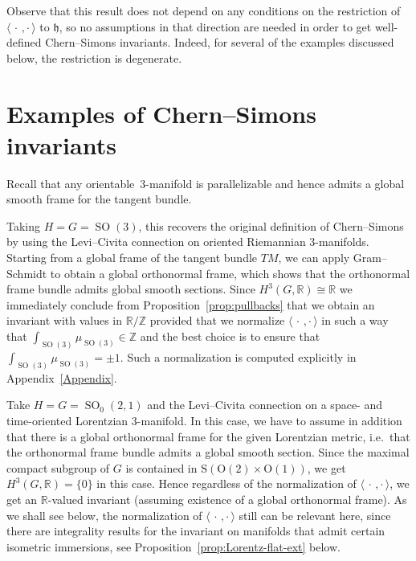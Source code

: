 \documentclass[AHL,Unicode,longabstracts]{cedram}
\newcommand{\x}{\times}
\newcommand{\B}[2]{\langle#1,#2\rangle}
\DeclareMathOperator{\SO}{SO}
\newcommand{\rmO}{\mathrm{O}}
\newcommand{\rmS}{\mathrm{S}}
\newcommand*{\R}{\mathbb{R}}
\newcommand{\Z}{\mathbb{Z}}
\newcommand{\fkh}{\mathfrak{h}}
\newcommand*{\R}{\mathbb{R}}
\begin{document}
\begin{rema}
Observe that this result does not depend on any conditions on the restriction of $\B{\,\cdot\,}{\cdot\,}$ to $\fkh$, so no assumptions in that direction are needed in order to get well-defined Chern--Simons invariants. Indeed, for several of the examples discussed below, the restriction is degenerate.
\end{rema}

\section{Examples of Chern--Simons invariants}\label{1.4}
Recall that any orientable~$3$-manifold is parallelizable and hence admits a global smooth frame for the tangent bundle.

\begin{exam}\label{exam4.1}
Taking $H=G=\SO(3)$, this recovers the original definition of Chern--Simons by using the Levi--Civita connection on oriented Riemannian $3$-manifolds. Starting from a global frame of the tangent bundle $TM$, we can apply Gram--Schmidt to obtain a global orthonormal frame, which shows that the orthonormal frame bundle admits global smooth sections. Since $H^3(G,\R)\cong\R$ we immediately conclude from Proposition~\ref{prop:pullbacks} that we obtain an invariant with values in $\R/\Z$ provided that we normalize $\B{\,\cdot\,}{\cdot\,}$ in such a way that $\int_{\SO(3)}\mu_{\SO(3)}\in\Z$ and the best choice is to ensure that $\int_{\SO(3)}\mu_{\SO(3)}=\pm 1$. Such a normalization is computed explicitly in Appendix~\ref{Appendix}.
\end{exam}


\begin{exam}\label{exam4.2}
Take $H=G=\SO_0(2,1)$ and the Levi--Civita connection on a space- and time-oriented Lorentzian $3$-manifold. In this case, we have to assume in addition that there is a global orthonormal frame for the given Lorentzian metric, i.e.\ that the orthonormal frame bundle admits a global smooth section. Since the maximal compact subgroup of $G$ is contained in $\rmS(\rmO(2)\x \rmO(1))$, we get $H^3(G,\R)=\{0\}$ in this case. Hence regardless of the normalization of $\B{\,\cdot\,}{\cdot\,}$, we get an $\R$-valued invariant (assuming existence of a global orthonormal frame). As we shall see below, the normalization of $\B{\,\cdot\,}{\cdot\,}$ still can be relevant here, since there are integrality results for the invariant on manifolds that admit certain isometric immersions, see Proposition~\ref{prop:Lorentz-flat-ext} below.
\end{exam}
\end{document}

